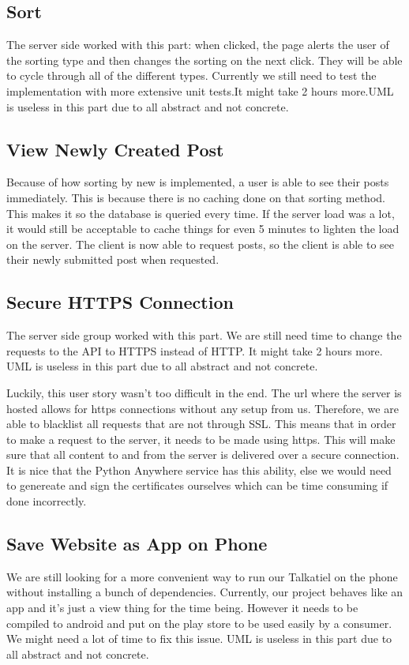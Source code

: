 \documentclass[12pt]{article}
\begin{document}
\subsection{Sort}
The server side worked with this part: when clicked, the page alerts the user of
the sorting type and then changes the sorting on the next click. They will be
able to cycle through all of the different types. Currently we still need to
test the implementation with more extensive unit tests.It might take 2 hours
more.UML is useless in this part due to all abstract and not concrete.

\subsection{View Newly Created Post}
Because of how sorting by new is implemented, a user is able to see their posts immediately.
This is because there is no caching done on that sorting method.  This makes it so the
database is queried every time.  If the server load was a lot, it would still be acceptable
to cache things for even 5 minutes to lighten the load on the server.  The client is now
able to request posts, so the client is able to see their newly submitted post when requested.

\subsection{Secure HTTPS Connection}
The server side group worked with this part. We are still need time to change
the requests to the API to HTTPS instead of HTTP. It might take 2 hours more.
UML is useless in this part due to all abstract and not concrete.

Luckily, this user story wasn't too difficult in the end.  The url where the server is hosted 
allows for https connections without any setup from us.  Therefore, we are able to blacklist
all requests that are not through SSL.  This means that in order to make a request to the
server, it needs to be made using https.  This will make sure that all content to and from the
server is delivered over a secure connection.  It is nice that the Python Anywhere service has
this ability, else we would need to genereate and sign the certificates ourselves which can be
time consuming if done incorrectly.

\subsection{Save Website as App on Phone}
We are still looking for a more convenient way to run our Talkatiel on the phone
without installing a bunch of dependencies. Currently, our project behaves like
an app and it’s just a view thing for the time being. However it needs to be
compiled to android and put on the play store to be used easily by a consumer.
We might need a lot of time to fix this issue. UML is useless in this part due
to all abstract and not concrete.
\end{document}
